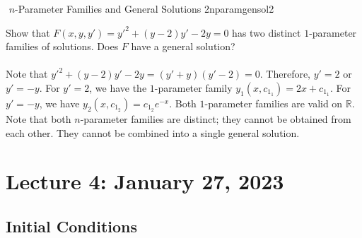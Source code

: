        \begin{example}{\Stop\,\,\(n\)-Parameter Families and General Solutions 2}{nparamgensol2}

            Show that \(F(x,y,y')=y'^2+(y-2)y'-2y=0\) has two distinct \(1\)-parameter families of solutions. Does \(F\) have a general solution?
            \\
            \\
            Note that \(y'^2+(y-2)y'-2y=(y'+y)(y'-2)=0\). Therefore, \(y'=2\) or \(y'=-y\). For \(y'=2\), we have the \(1\)-parameter family \(y_1(x,c_{1_1})=2x+c_{1_1}\). For \(y'=-y\), we have \(y_2(x,c_{1_2})=c_{1_2}e^{-x}\). Both \(1\)-parameter families are valid on \(\mathbb{R}\). Note that both \(n\)-parameter families are distinct; they cannot be obtained from each other. They cannot be combined into a single general solution.
        \end{example}

        \pagebreak

\section{Lecture 4: January 27, 2023}

    \subsection{Initial Conditions}

